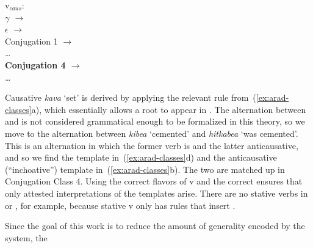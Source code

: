 \begin{exe}
\begin{xlist}
\begin{xlist}
\begin{exe}
\begin{xlist}
\begin{xlist}
\begin{exe}
\begin{xlist}
\begin{xlist}
\begin{exe}
\begin{exe}
\begin{xlist}
\begin{exe}
\begin{exe}
\begin{xlist}
\begin{exe}
\begin{exe}
\begin{exe}
\begin{exe}
\begin{exe}
\begin{xlist}
\begin{exe}
\begin{xlist}
\begin{exe}
\begin{exe}
\begin{xlist}
\begin{exe}
\begin{xlist}
\begin{exe}
\begin{xlist}
\begin{exe}
\begin{exe}
\begin{exe}
\begin{xlist}
\begin{exe}
\begin{exe}
\begin{exe}
\begin{xlist}
\begin{exe}
\begin{xlist}
\begin{exe}
\begin{xlist}
\begin{exe}
\begin{xlist}
\begin{exe}
\begin{exe}
\begin{exe}
\begin{exe}
\begin{xlist}
\begin{exe}
\begin{xlist}
\begin{exe}
\begin{xlist}
\begin{exe}
\begin{xlist}
\begin{exe}
\begin{xlist}
\begin{exe}
\begin{xlist}
\begin{exe}
\begin{exe}
\begin{exe}
\begin{exe}
\begin{xlist}
\begin{exe}
\begin{xlist}
\begin{exe}
\begin{xlist}
\begin{exe}
\begin{exe}
\begin{xlist}
\begin{exe}
\begin{xlist}
\begin{exe}
\begin{exe}
\begin{exe}
\begin{exe}
\begin{xlist}
\begin{xlist}
\begin{exe}
\begin{xlist}
\begin{exe}
\begin{exe}
\begin{exe}
\begin{xlist}
\begin{exe}
\begin{exe}
\begin{xlist}
\begin{exe}
\begin{exe}
\begin{exe}
\begin{xlist}
\begin{xlist}
\begin{exe}
\begin{xlist}
\begin{exe}
\begin{exe}
\begin{exe}
\begin{exe}
\begin{xlist}
\begin{exe}
\begin{xlist}
\begin{exe}
\begin{xlist}
\begin{exe}
\begin{xlist}
\begin{exe}
\begin{exe}
\begin{exe}
\begin{exe}
\begin{exe}
\begin{exe}
\begin{xlist}
\begin{exe}
\begin{xlist}
\begin{exe}
\begin{xlist}
\begin{exe}
\begin{xlist}
\begin{exe}
\begin{xlist}
\begin{exe}
\begin{xlist}
\begin{exe}
\begin{xlist}
\begin{exe}
\begin{xlist}
\begin{exe}
\begin{xlist}
\begin{multicols}{2}
{\tkal}
 	\ex  v$_{caus}$: \\
			\textbf{$\gamma$ $\rightarrow$ {\tpie}}\\
			$\epsilon$ $\rightarrow$ {\thif}\\
			Conjugation 1 $\rightarrow$ {\tkal}\\
			\dots \\
			\textbf{Conjugation 4 $\rightarrow$ {\tpie}}\\
			\dots
	\end{multicols}
 \z
\z 

Causative \emph{kava} `set' is derived by applying the relevant rule from~(\ref{ex:arad-classes}a), which essentially allows a root to appear in {\tkal}. The alternation between {\tkal} and {\tpie} is not considered grammatical enough to be formalized in this theory, so we move to the alternation between \emph{kibea} `cemented' and \emph{hitkabea} `was cemented'. This is an alternation in which the former verb is  and the latter anticausative, and so we find the  template in~(\ref{ex:arad-classes}d) and the anticausative (``inchoative'') template in~(\ref{ex:arad-classes}b). The two are matched up in Conjugation Class 4. Using the correct flavors of v and the correct  ensures that only attested interpretations of the templates arise. There are no stative verbs in {\tpie} or {\thit}, for example, because stative v only has rules that insert {\tkal}. 

Since the goal of this work is to reduce the amount of generality encoded by the system, the 
\end{xlist}
\end{exe}
\end{xlist}
\end{exe}
\end{xlist}
\end{exe}
\end{xlist}
\end{exe}
\end{xlist}
\end{exe}
\end{xlist}
\end{exe}
\end{xlist}
\end{exe}
\end{xlist}
\end{exe}
\end{xlist}
\end{exe}
\end{exe}
\end{exe}
\end{exe}
\end{exe}
\end{exe}
\end{xlist}
\end{exe}
\end{xlist}
\end{exe}
\end{xlist}
\end{exe}
\end{xlist}
\end{exe}
\end{exe}
\end{exe}
\end{exe}
\end{xlist}
\end{exe}
\end{xlist}
\end{xlist}
\end{exe}
\end{exe}
\end{exe}
\end{xlist}
\end{exe}
\end{exe}
\end{xlist}
\end{exe}
\end{exe}
\end{exe}
\end{xlist}
\end{exe}
\end{xlist}
\end{xlist}
\end{exe}
\end{exe}
\end{exe}
\end{exe}
\end{xlist}
\end{exe}
\end{xlist}
\end{exe}
\end{exe}
\end{xlist}
\end{exe}
\end{xlist}
\end{exe}
\end{xlist}
\end{exe}
\end{exe}
\end{exe}
\end{exe}
\end{xlist}
\end{exe}
\end{xlist}
\end{exe}
\end{xlist}
\end{exe}
\end{xlist}
\end{exe}
\end{xlist}
\end{exe}
\end{xlist}
\end{exe}
\end{exe}
\end{exe}
\end{exe}
\end{xlist}
\end{exe}
\end{xlist}
\end{exe}
\end{xlist}
\end{exe}
\end{xlist}
\end{exe}
\end{exe}
\end{exe}
\end{xlist}
\end{exe}
\end{exe}
\end{exe}
\end{xlist}
\end{exe}
\end{xlist}
\end{exe}
\end{xlist}
\end{exe}
\end{exe}
\end{xlist}
\end{exe}
\end{xlist}
\end{exe}
\end{exe}
\end{exe}
\end{exe}
\end{exe}
\end{xlist}
\end{exe}
\end{exe}
\end{xlist}
\end{exe}
\end{exe}
\end{xlist}
\end{xlist}
\end{exe}
\end{xlist}
\end{xlist}
\end{exe}
\end{xlist}
\end{xlist}
\end{exe}
